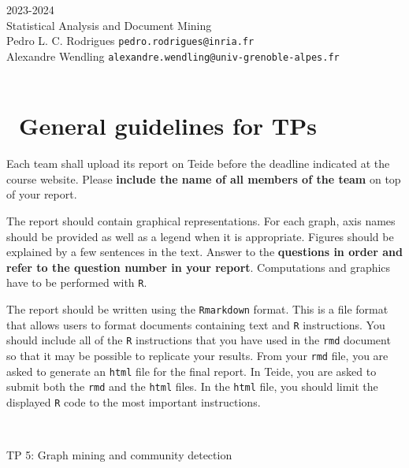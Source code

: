 \begin{flushleft}
 \hfill {} 2023-2024 \\
Statistical Analysis and Document Mining \\
Pedro L. C. Rodrigues   \hfill  \texttt{pedro.rodrigues@inria.fr} \\
Alexandre Wendling \hfill \texttt{alexandre.wendling@univ-grenoble-alpes.fr} \\

\HRuleTop\\

\section*{\faExclamationTriangle~General guidelines for TPs}

Each team shall upload its report on Teide before the deadline indicated at the course website. Please \textbf{include the name of all members of the team} on top of your report. 

The report should contain graphical representations. For each graph, axis names should be provided as well as a legend when it is appropriate. Figures should be explained by a few sentences in the text. Answer to the \textbf{questions in order and refer to the question number in your report}. Computations and graphics have to be performed with \texttt{R}.

The report should be written using the \texttt{Rmarkdown} format. This is a file format that allows users to format documents containing text and \texttt{R} instructions. You should include all of the \texttt{R} instructions that you have used in the \texttt{rmd} document so that it may be possible to replicate your results. From your \texttt{rmd} file, you are asked to generate an \texttt{html} file for the final report. In Teide, you are asked to submit both the \texttt{rmd} and the \texttt{html} files. In the \texttt{html} file, you should limit the displayed \texttt{R} code to the most important instructions.

\HRuleTop\\
\begin{center}
\Large{TP 5: Graph mining and community detection}
\end{center}
\HRuleBottom
\end{flushleft}
